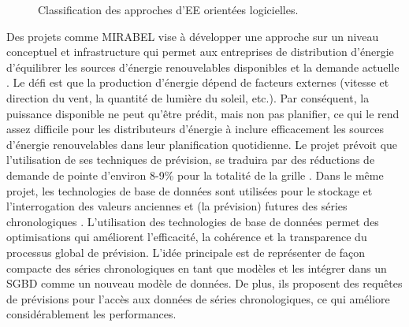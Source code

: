 \begin{figure}
\footnotesize
\begin{center}

\caption{Classification des approches d’EE orientées logicielles.}
\label{fig:software-approaches-classification}
\end{center}
\end{figure}

Des projets comme MIRABEL vise à développer une approche sur un niveau conceptuel et infrastructure qui permet aux entreprises de distribution d'énergie d'équilibrer les sources d'énergie renouvelables disponibles et la demande actuelle \cite{Siksnys12}. Le défi est que la production d'énergie dépend de facteurs externes (vitesse et direction du vent, la quantité de lumière du soleil, etc.). Par conséquent, la puissance disponible ne peut qu'être prédit, mais non pas planifier, ce qui le rend assez difficile pour les distributeurs d'énergie à inclure efficacement les sources d'énergie renouvelables dans leur planification quotidienne. Le projet prévoit que l'utilisation de ses techniques de prévision, se traduira par des réductions de demande de pointe d'environ 8-9\% pour la totalité de la grille \cite{Siksnys12}. Dans le même projet, les technologies de base de données sont utilisées pour le stockage et l'interrogation des valeurs anciennes et (la prévision) futures des séries chronologiques \cite{Khalefa12, Fischer13}. L'utilisation des technologies de base de données permet des optimisations qui améliorent l'efficacité, la cohérence et la transparence du processus global de prévision. L'idée principale est de représenter de façon compacte des séries chronologiques en tant que modèles et les intégrer dans un SGBD comme un nouveau modèle de données. De plus, ils proposent des requêtes de prévisions pour l'accès aux données de séries chronologiques, ce qui améliore considérablement les performances.

